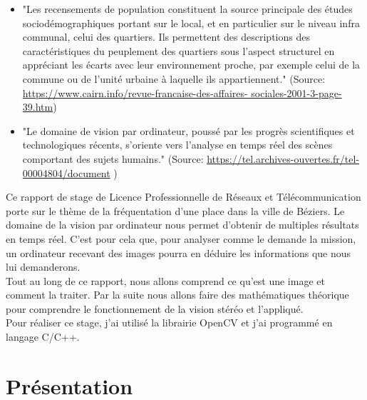 \documentclass[12pt, french]{report}
\begin{document}
    \begin{itemize}
        \item "Les recensements de population constituent la source principale des études sociodémographiques portant sur le local, et en particulier sur le niveau infra communal, celui des quartiers. Ils permettent des descriptions des caractéristiques du peuplement des quartiers sous l’aspect structurel en appréciant les écarts avec leur environnement proche, par exemple celui de la commune ou de l’unité urbaine à laquelle ils appartiennent."
        (Source: \href{https://www.cairn.info/revue-francaise-des-affaires- sociales-2001-3-page-39.htm}{https://www.cairn.info/revue-francaise-des-affaires- sociales-2001-3-page-39.htm})\\
        

    \item "Le domaine de vision par ordinateur, poussé par les progrès scientifiques et technologiques récents, s’oriente vers l’analyse en temps réel des scènes comportant des sujets humains." (Source: \href{https://tel.archives-ouvertes.fr/tel-00004804/document}{https://tel.archives-ouvertes.fr/tel-00004804/document} ) %
    \\
    \end{itemize}
        
    Ce rapport de stage de Licence Professionnelle de Réseaux et Télécommunication porte sur le thème de la fréquentation d'une place dans la ville de Béziers. Le domaine de la vision par ordinateur nous permet d'obtenir de multiples résultats en temps réel. C'est pour cela que, pour analyser comme le demande la mission, un ordinateur recevant des images pourra en déduire les informations que nous lui demanderons. \\
    Tout au long de ce rapport, nous allons comprend ce qu'est une image et comment la traiter. Par la suite nous allons faire des mathématiques théorique pour comprendre le fonctionnement de la vision stéréo et l'appliqué. \\
    Pour réaliser ce stage, j'ai utilisé la librairie OpenCV et j'ai programmé en langage C/C++.

\newpage
\section{Présentation}
\end{document}
